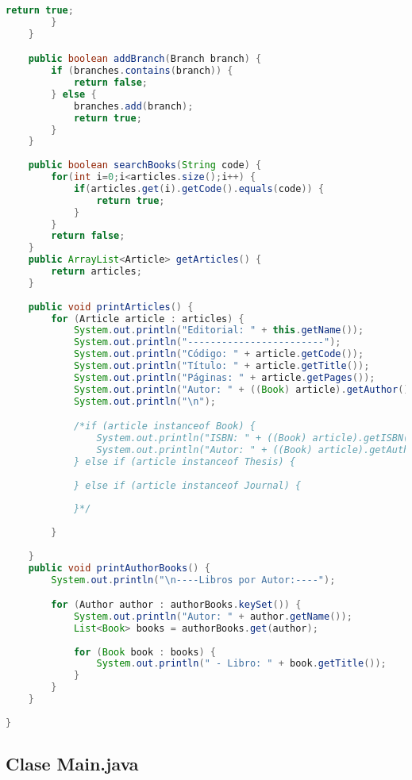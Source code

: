 \documentclass{article}
\begin{document}
\begin{itemize}
\begin{lstlisting}[language=java]
            return true;
        }
    }

	public boolean addBranch(Branch branch) {
        if (branches.contains(branch)) {
            return false;
        } else {
            branches.add(branch);
            return true;
        }
    }	
	
	public boolean searchBooks(String code) {
		for(int i=0;i<articles.size();i++) {
			if(articles.get(i).getCode().equals(code)) {
				return true;
			}
		}
		return false;
	}
	public ArrayList<Article> getArticles() {
		return articles;
	}
	
	public void printArticles() {
		for (Article article : articles) {
            System.out.println("Editorial: " + this.getName());
            System.out.println("------------------------");
            System.out.println("Código: " + article.getCode());
            System.out.println("Título: " + article.getTitle());
            System.out.println("Páginas: " + article.getPages());
            System.out.println("Autor: " + ((Book) article).getAuthor().getName());
            System.out.println("\n");

            /*if (article instanceof Book) {
                System.out.println("ISBN: " + ((Book) article).getISBN());
                System.out.println("Autor: " + ((Book) article).getAuthor().getName());
            } else if (article instanceof Thesis) {
              
            } else if (article instanceof Journal) {
     
            }*/
   
        }
		
	}
    public void printAuthorBooks() {
        System.out.println("\n----Libros por Autor:----");

        for (Author author : authorBooks.keySet()) {
            System.out.println("Autor: " + author.getName());
            List<Book> books = authorBooks.get(author);
            
            for (Book book : books) {
                System.out.println(" - Libro: " + book.getTitle());
            }
        }
    }
		
}
        \end{lstlisting}
        
        \subsection{Clase Main.java}


\end{itemize}
\end{document}
